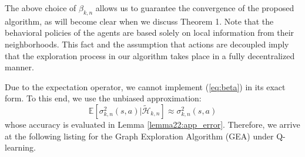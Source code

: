 \documentclass[lettersize,journal]{IEEEtran}
\begin{document}
The above choice of $\beta_{k,n}$ allows us to guarantee the convergence of the proposed algorithm, as will become clear when we discuss Theorem 1. Note that the behavioral policies of the agents are based solely on local information from their neighborhoods. This fact and the assumption that actions are  decoupled imply that the exploration process in our algorithm takes place in a fully decentralized manner. \par
 Due to the expectation operator, we cannot implement (\ref{eq:beta}) in its exact form. To this end, we use the unbiased approximation:
 \begin{equation}
 \label{eq:approximation}
     \mathbb{E} \left[\sigma_{k,n}^2(s,a)|\widetilde{\mathcal{H}}_{k,n}\right ]\approx \sigma_{k,n}^2(s,a)
 \end{equation}
 whose accuracy is evaluated in Lemma \ref{lemma22:app_error}. Therefore, we arrive at the following listing for the Graph Exploration Algorithm (GEA) under Q-learning.
\end{document}
